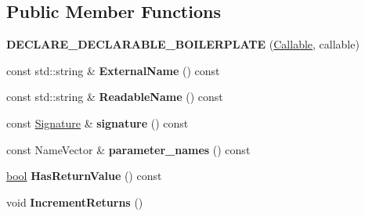 \subsection*{Public Member Functions}
\begin{DoxyCompactItemize}
\item 
\mbox{\label{classv8_1_1internal_1_1torque_1_1Callable_a40187a84fa2088b97db074e54084f900}} 
{\bfseries D\+E\+C\+L\+A\+R\+E\+\_\+\+D\+E\+C\+L\+A\+R\+A\+B\+L\+E\+\_\+\+B\+O\+I\+L\+E\+R\+P\+L\+A\+TE} (\mbox{\hyperlink{classv8_1_1internal_1_1torque_1_1Callable}{Callable}}, callable)
\item 
\mbox{\label{classv8_1_1internal_1_1torque_1_1Callable_a5645cb670b4e49adeac434457a60a0ee}} 
const std\+::string \& {\bfseries External\+Name} () const
\item 
\mbox{\label{classv8_1_1internal_1_1torque_1_1Callable_a908d3f16b9743281bba9fa71b5c6aa9b}} 
const std\+::string \& {\bfseries Readable\+Name} () const
\item 
\mbox{\label{classv8_1_1internal_1_1torque_1_1Callable_a445dc006f22f19a4785ad63d9a2b769e}} 
const \mbox{\hyperlink{structv8_1_1internal_1_1torque_1_1Signature}{Signature}} \& {\bfseries signature} () const
\item 
\mbox{\label{classv8_1_1internal_1_1torque_1_1Callable_a4488127841e7400a745c2cdfa3694df9}} 
const Name\+Vector \& {\bfseries parameter\+\_\+names} () const
\item 
\mbox{\label{classv8_1_1internal_1_1torque_1_1Callable_a134d247ea995c1228f84ed22a69a468c}} 
\mbox{\hyperlink{classbool}{bool}} {\bfseries Has\+Return\+Value} () const
\item 
\mbox{\label{classv8_1_1internal_1_1torque_1_1Callable_a0474e32a2cf84d37bf99d09be5c38b57}} 
void {\bfseries Increment\+Returns} ()
\item 
\mbox{\label{classv8_1_1internal_1_1torque_1_1Callable_a39f77ecd1bd9b7aff14e92411ec251d2}} 

\end{DoxyCompactItemize}
